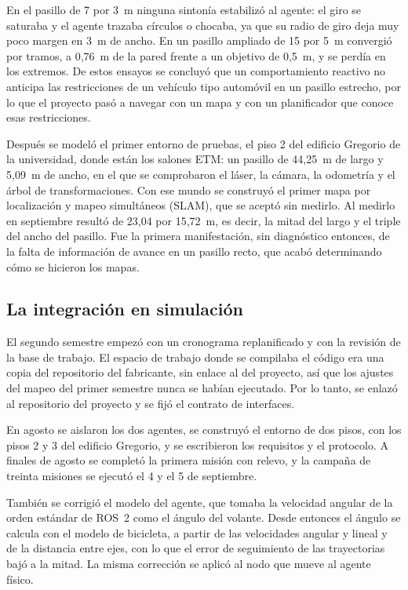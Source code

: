 En el pasillo de 7 por 3~m ninguna sintonía estabilizó al agente: el giro se saturaba y el agente trazaba círculos o chocaba,
ya que su radio de giro deja muy poco margen en 3~m de ancho. En un pasillo ampliado de 15 por 5~m convergió por tramos, a
0,76~m de la pared frente a un objetivo de 0,5~m, y se perdía en los extremos. De estos ensayos se concluyó que un
comportamiento reactivo no anticipa las restricciones de un vehículo tipo automóvil en un pasillo estrecho, por lo que el
proyecto pasó a navegar con un mapa y con un planificador que conoce esas restricciones.

Después se modeló el primer entorno de pruebas, el piso 2 del edificio Gregorio de la universidad, donde están los salones ETM:
un pasillo de 44,25~m de largo y 5,09~m de ancho, en el que se comprobaron el láser, la cámara, la odometría y el árbol de
transformaciones. Con ese mundo se construyó el primer mapa por localización y mapeo simultáneos (SLAM), que se aceptó sin
medirlo. Al medirlo en septiembre resultó de 23,04 por 15,72~m, es decir, la mitad del largo y el triple del ancho del
pasillo. Fue la primera manifestación, sin diagnóstico entonces, de la falta de información de avance en un pasillo recto, que
acabó determinando cómo se hicieron los mapas.

\subsection{La integración en simulación}
\label{sec:recorrido-sim}

El segundo semestre empezó con un cronograma replanificado y con la revisión de la base de trabajo. El espacio de trabajo donde
se compilaba el código era una copia del repositorio del fabricante, sin enlace al del proyecto, así que los ajustes del mapeo
del primer semestre nunca se habían ejecutado. Por lo tanto, se enlazó al repositorio del proyecto y se fijó el contrato de
interfaces.

En agosto se aislaron los dos agentes, se construyó el entorno de dos pisos, con los pisos 2 y 3 del edificio Gregorio, y se
escribieron los requisitos y el protocolo. A finales de agosto se completó la primera misión con relevo, y la campaña de treinta
misiones se ejecutó el 4 y el 5 de septiembre.

También se corrigió el modelo del agente, que tomaba la velocidad angular de la orden estándar de ROS~2 como el ángulo del
volante. Desde entonces el ángulo se calcula con el modelo de bicicleta, a partir de las velocidades angular y lineal y de la
distancia entre ejes, con lo que el error de seguimiento de las trayectorias bajó a la mitad. La misma corrección se aplicó al
nodo que mueve al agente físico.


